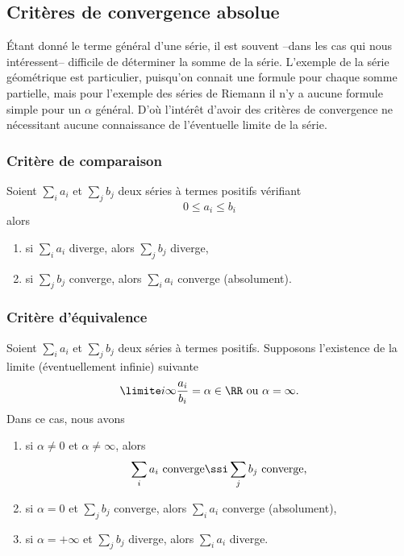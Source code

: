 \subsection{Critères de convergence absolue}

  Étant donné le terme général d'une série, il est souvent --dans les cas qui nous intéressent-- difficile de déterminer la somme de la série. L'exemple de la série géométrique est particulier, puisqu'on connait une formule pour chaque somme partielle, mais pour l'exemple des séries de Riemann il n'y a aucune formule simple pour un $\alpha$ général. D'où l'intérêt d'avoir des critères de convergence ne nécessitant aucune connaissance de l'éventuelle limite de la série.

\subsubsection{Critère de comparaison} 

Soient $\sum_i a_i$ et $\sum_j
b_j$ deux séries à termes positifs vérifiant
\begin{equation*}
  0 \leq a_i \leq b_i
\end{equation*}
alors
\begin{enumerate}
\item si $\sum_i a_i$ diverge, alors $\sum_j b_j$ diverge,
\item si $\sum_j b_j$ converge, alors $\sum_i a_i$ converge
  (absolument).
\end{enumerate}

\subsubsection{Critère d'équivalence}
\label{PgCritEquiv}

\begin{proposition}
 Soient $\sum_i a_i$ et $\sum_j b_j$ deux séries à termes positifs. Supposons l'existence de la limite (éventuellement infinie) suivante
\begin{equation}
  \limite i \infty \frac{a_i}{b_i} = \alpha \in \RR \text{ ou $\alpha =
    \infty$.}
\end{equation}
Dans ce cas, nous avons
\begin{enumerate}
\item si $\alpha \neq 0$ et $\alpha\neq \infty$, alors
  \begin{equation}
    \sum_i a_i \text{~converge} \ssi \sum_j b_j\text{~converge,}
  \end{equation}
\item si $\alpha = 0$ et $\sum_j b_j$ converge, alors $\sum_i a_i$
  converge (absolument),
\item si $\alpha = +\infty$ et $\sum_j b_j$ diverge, alors $\sum_i
  a_i$ diverge.
\end{enumerate}
\end{proposition}

